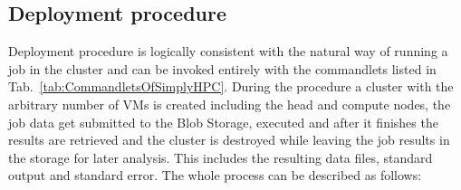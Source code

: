 \documentclass[3p,times]{elsarticle}
\begin{document}

\subsection{Deployment procedure}
\label{sec:deploymentProcedure}

Deployment procedure is logically consistent with the natural way of running a job in the cluster and can be invoked entirely with the commandlets listed in Tab.~\ref{tab:CommandletsOfSimplyHPC}. During the procedure a cluster with the arbitrary number of VMs is created including the head and compute nodes, the job data get submitted to the Blob Storage, executed and after it finishes the results are retrieved and the cluster is destroyed while leaving the job results in the storage for later analysis. This includes the resulting data files, standard output and standard error. The whole process can be described as follows:
	
\end{document}
